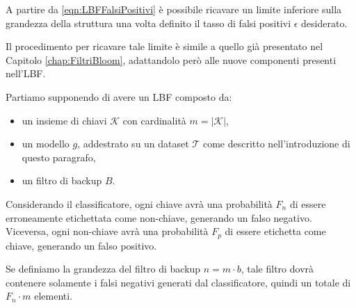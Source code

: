 \documentclass[../../main.tex]{subfiles}
\begin{document}
    A partire da \eqref{eqn:LBFFalsiPositivi} è possibile ricavare un limite inferiore sulla grandezza della struttura una volta definito il tasso di falsi positivi $\epsilon$ desiderato.

    Il procedimento per ricavare tale limite è simile a quello già presentato nel Capitolo \ref{chap:FiltriBloom}, adattandolo però alle nuove componenti presenti nell'LBF.

    Partiamo supponendo di avere un LBF composto da: 
    \begin{itemize}
        \item un insieme di chiavi $\mathcal{K}$ con cardinalità $m = |\mathcal{K}|$,
        \item un modello $g$, addestrato su un dataset $\mathcal{T}$ come descritto nell'introduzione di questo paragrafo,
        \item un filtro di backup $B$.
    \end{itemize}
    Considerando il classificatore, ogni chiave avrà una probabilità $F_n$ di essere erroneamente etichettata come non-chiave, generando un falso negativo. Viceversa, ogni non-chiave avrà una probabilità $F_p$ di essere etichetta come chiave, generando un falso positivo. 
    
    Se definiamo  la grandezza del filtro di backup $n = m \cdot b$, tale filtro dovrà contenere solamente i falsi negativi generati dal classificatore, quindi un totale di $F_n \cdot m$ elementi.
\end{document}
